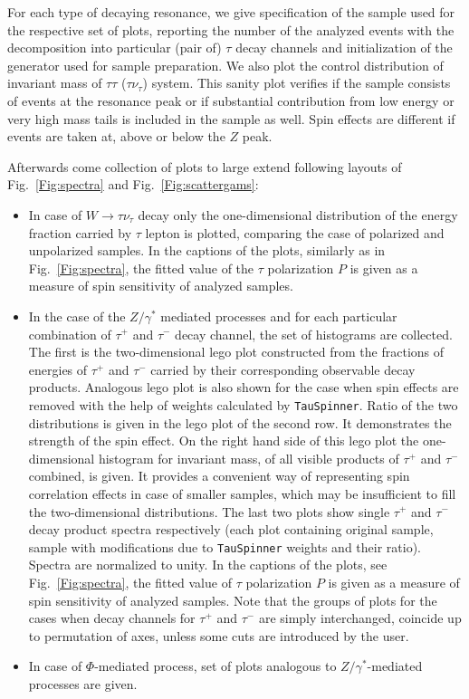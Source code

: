 \documentclass{article}
\begin{document}
For each type of decaying resonance, we give specification of the sample used
for the respective set of  plots, reporting the number of the analyzed events with the decomposition 
into particular (pair of)  $\tau$ decay channels and initialization of the generator used for sample preparation. 
We also plot the control distribution of invariant mass of $\tau\tau$ ($\tau\nu_\tau$) system. 
This sanity plot verifies if the sample consists
of events  at the resonance peak or if substantial contribution from low energy 
or very high mass tails is included in the sample as well.
Spin effects are different if events are taken at, above or below the $Z$ peak. 

Afterwards come collection of  
 plots to large extend following layouts of Fig.~\ref{Fig:spectra} and Fig.~\ref{Fig:scattergams}: 

\begin{itemize}
\item
In case of $W \to \tau \nu_\tau$ decay only the one-dimensional distribution of the energy fraction
carried by $\tau$ lepton is plotted, comparing the case of polarized and unpolarized samples. 
In the captions of the plots, similarly as in  Fig.~\ref{Fig:spectra},
the fitted value of the $\tau$ polarization $P$ is given as a measure of spin sensitivity of analyzed samples. 
\item
In the case of the $Z/\gamma^*$ mediated processes and for each particular combination of $\tau^+$ and $\tau^-$ decay 
channel, the  set of histograms are collected.
The first is the two-dimensional lego plot constructed from the fractions of energies of $\tau^+$ and $\tau^-$ 
carried by their corresponding  observable decay products.  Analogous lego plot is also shown for the case 
when spin effects are removed  with the help of weights calculated by {\tt TauSpinner}. 
Ratio of the two distributions is given in the  lego plot of the second row. 
It demonstrates the strength of the spin effect. On the right hand side of this 
lego plot
the one-dimensional histogram for invariant mass, of all visible products of $\tau^+$ and $\tau^-$ combined, is given.
It provides a convenient way of representing spin correlation effects in case of smaller samples, which may be insufficient
to fill the two-dimensional distributions.
The last two plots show single $\tau^+$ and $\tau^-$ decay product spectra respectively
(each plot containing original sample, sample with modifications
due to {\tt TauSpinner} weights and their ratio). Spectra are normalized to unity.
In the captions of the plots, see Fig.~\ref{Fig:spectra}, the
fitted value of $\tau$ polarization $P$ is given as a measure of spin sensitivity of analyzed samples. 
Note that the groups of plots for the cases when  decay channels for $\tau^+$ and $\tau^-$ are simply 
interchanged, coincide up to permutation of axes, unless some cuts are introduced by the user. 
\item
In case of $\Phi$-mediated process, set of plots analogous to  $Z/\gamma^*$-mediated processes
are given.
\end{itemize} 
\end{document}
